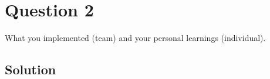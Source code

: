 \section*{Question 2}

What you implemented (team) and your personal learnings (individual).

\subsection*{Solution}
